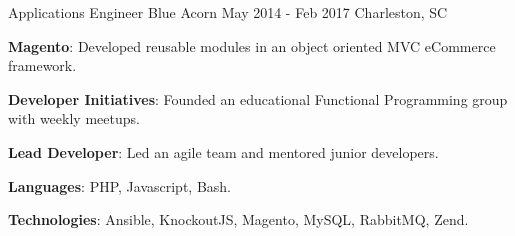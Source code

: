 \begin{cventries}

  \cventry
    {Applications Engineer} %
    {Blue Acorn} %
    {May 2014 - Feb 2017} %
    {Charleston, SC} %
    {
      \begin{cvitems} %
        \item {\color{graytext}\textbf{Magento}}: Developed reusable modules in
          an object oriented MVC eCommerce framework.
        \item {\color{graytext}\textbf{Developer Initiatives}}: Founded an
          educational Functional Programming group with weekly meetups.
        \item {\color{graytext}\textbf{Lead Developer}}: Led an agile team
          and mentored junior developers.
        \item {\color{graytext}\textbf{Languages}}: PHP, Javascript, Bash.
        \item {\color{graytext}\textbf{Technologies}}: Ansible, KnockoutJS, Magento,
          MySQL, RabbitMQ, Zend.
      \end{cvitems}
    }

\end{cventries}
